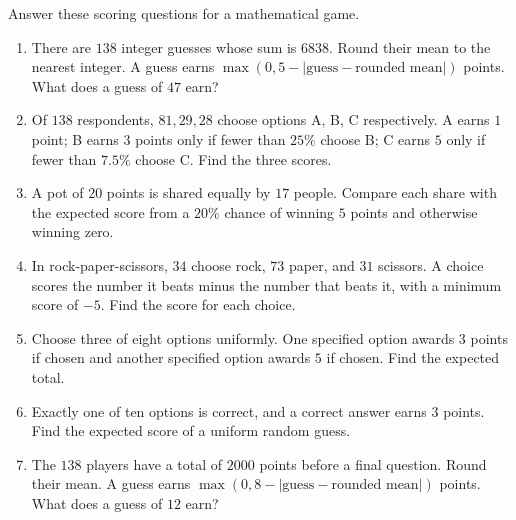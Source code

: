 Answer these scoring questions for a mathematical game.
\begin{enumerate}
\item There are $138$ integer guesses whose sum is $6838$. Round their mean to the nearest integer. A guess earns $\max(0,5-|\text{guess}-\text{rounded mean}|)$ points. What does a guess of $47$ earn?
\item Of $138$ respondents, $81,29,28$ choose options A, B, C respectively. A earns $1$ point; B earns $3$ points only if fewer than $25\%$ choose B; C earns $5$ only if fewer than $7.5\%$ choose C. Find the three scores.
\item A pot of $20$ points is shared equally by $17$ people. Compare each share with the expected score from a $20\%$ chance of winning $5$ points and otherwise winning zero.
\item In rock-paper-scissors, $34$ choose rock, $73$ paper, and $31$ scissors. A choice scores the number it beats minus the number that beats it, with a minimum score of $-5$. Find the score for each choice.
\item Choose three of eight options uniformly. One specified option awards $3$ points if chosen and another specified option awards $5$ if chosen. Find the expected total.
\item Exactly one of ten options is correct, and a correct answer earns $3$ points. Find the expected score of a uniform random guess.
\item The $138$ players have a total of $2000$ points before a final question. Round their mean. A guess earns $\max(0,8-|\text{guess}-\text{rounded mean}|)$ points. What does a guess of $12$ earn?
\end{enumerate}
